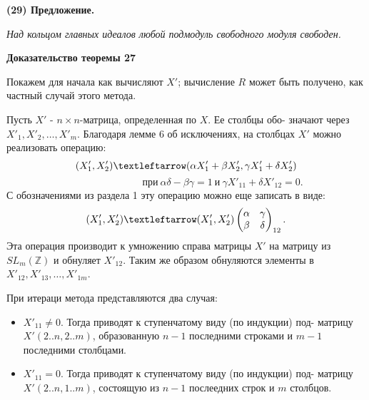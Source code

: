 \documentclass{mai_book}
\begin{document}
	\noindent
	{\bf (29) Предложение.}
	
	{\it Над кольцом главных идеалов любой подмодуль свободного модуля\linebreak
	свободен.}
	
	\pagebreak
	
	
	\noindent
	{\bf Доказательство теоремы 27}
	
	Покажем для начала как вычисляют $X'$; вычисление $R$ может быть\linebreak
	получено, как частный случай этого метода.
	
	Пусть $X'$ - $n\times n$-матрица, определенная по $X$. Ее столбцы обо-\linebreak
	значают через $X'_{1}, X'_{2}, \ldots, X'_{m}$. Благодаря лемме 6 об исключениях, на\linebreak
	столбцах $X'$ можно реализовать операцию:
	$$(X'_1, X'_2) \textleftarrow (\alpha X'_1 + \beta X'_2, \gamma X'_1 + \delta X'_2)$$
	$$\ \ \ \ \ \ \ \ \ \ \ \ \ \ \ \ \ \ \ \ \ \ \ \ \ \ \ \ \ \ \ \ \ \text{при} \ \alpha\delta-\beta\gamma = 1 \ \text{и} \ \gamma X'_{11} + \delta X'_{12} = 0.$$
	С обозначениями из раздела 1 эту операцию можно еще записать в виде:
	$$(X'_1, X'_2) \textleftarrow (X'_1, X'_2) \begin{pmatrix} \alpha & \gamma \\ \beta & \delta \end{pmatrix}_{12}.$$
	Эта операция производит к умножению справа матрицы $X'$ на матрицу\linebreak
	из $SL_{m}(\mathbb Z)$ и обнуляет $X'_{12}$. Таким же образом обнуляются элементы в\linebreak
	$X'_{12}, X'_{13}, \ldots, X'_{1m}$.
	
	При итераци метода представляются два случая:
	
	\begin{itemize}
	\item $X'_{11} \neq 0$. Тогда приводят к ступенчатому виду (по индукции) под-\linebreak
	матрицу $X'(2..n, 2..m)$, образованную $n - 1$ последними строками\linebreak
	и $m - 1$ последними столбцами.
	
	\item $X'_{11} = 0$. Тогда приводят к ступенчатому виду (по индукции) под-\linebreak
	матрицу $X'(2..n, 1..m)$, состоящую из $n - 1$ послеедних строк и\linebreak
	$m$ столбцов.
	\end{itemize}
	
\end{document}

